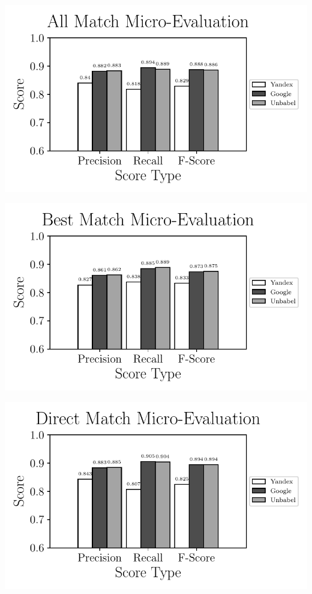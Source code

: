 \includegraphics{SupportFiles/plots/all_match_micro_clinical_anatomical_subtrees_plot.pdf}

\includegraphics{SupportFiles/plots/best_match_micro_clinical_anatomical_subtrees_plot.pdf}

\includegraphics{SupportFiles/plots/direct_match_micro_clinical_anatomical_subtrees_plot.pdf}


